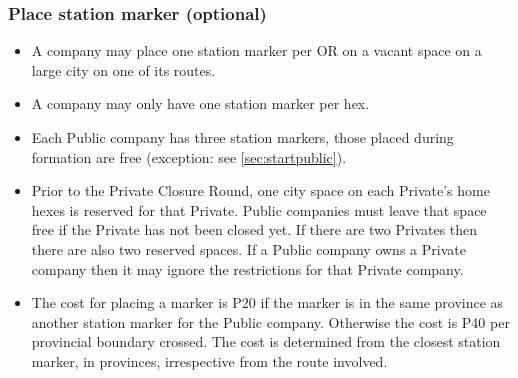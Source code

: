 \documentclass[a4paper,twocolumn]{article}
\begin{document}
\subsubsection{Place station marker (optional)}
\begin{itemize}
	\item A company may place one station marker per OR on a vacant space on a
	large city on one of its routes.
	\item A company may only have one station marker per hex.
	\item Each Public company has three station markers, those placed during
	formation are free (exception: see \autoref{sec:startpublic}).
	\item Prior to the Private Closure Round, one city space on each Private's
	home hexes is reserved for that Private. Public companies must leave that
	space free if the Private has not been closed yet. If there are two Privates
	then there are also two reserved spaces. If a Public company owns a Private
	company then it may ignore the restrictions for that Private company.
	\item The cost for placing a marker is P20 if the marker is in the same
	province as another station marker for the Public company. Otherwise the
	cost is P40 per provincial boundary crossed. The cost is determined from the
	closest station marker, in provinces, irrespective from the route involved.
\end{itemize}
\end{document}
